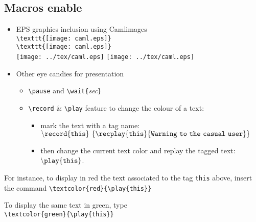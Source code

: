 \documentclass[12pt]{article}
\begin{document}
\subsection* {Macros enable}
  \begin{itemize}
  \item EPS graphics inclusion using Camlimages\\
        \verb+\texttt{[image: caml.eps]}+\\
        \verb+\texttt{[image: caml.eps]}+\\
        \texttt{[image: ../tex/caml.eps]}
        \texttt{[image: ../tex/caml.eps]}
  \item Other eye candies for presentation
        \begin{itemize}
        \item \verb+\pause+ \pause
          and \verb+\wait{+{\em sec}\verb+}+ 

        \item \verb+\record+ \& \verb+\play+ feature to change the colour
         of a text:
         \begin{itemize}
           \item mark the text with a tag name:\\
             $\tt{\backslash}record\{this\}\
                  \{\recplay{this}{Warning~to~the~casual~user}\}$
           \item then change the current text color and replay the tagged text:
          $\tt{\backslash}play\{this\}$.
         \end{itemize}
        \end{itemize}
\end{itemize}

\noindent
For instance, to display in red the text associated to the tag
{\tt this} above, insert the command
\verb+\textcolor{red}{\play{this}}+\\
\pause%
\textcolor{c1}{}\pause

\noindent
To display the same text in green, type\\
\verb+\textcolor{green}{\play{this}}+\\
\pause\textcolor{green}{\pause}
\end{document}
